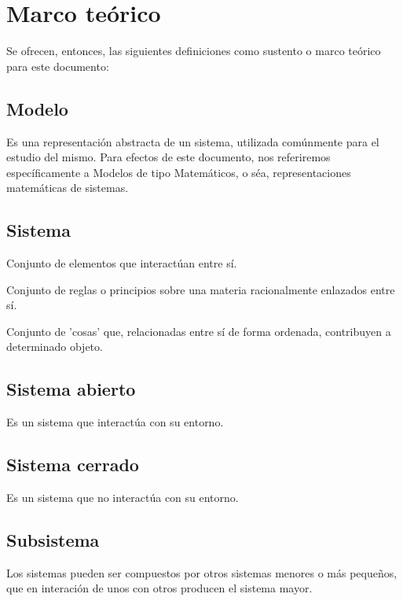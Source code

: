\section{Marco teórico}
Se ofrecen, entonces, las siguientes definiciones como sustento o marco teórico para este documento:


\subsection{Modelo}
Es una representación abstracta de un sistema, utilizada comúnmente para el estudio del mismo. Para efectos de este documento, nos referiremos específicamente a Modelos de tipo Matemáticos, o séa, representaciones matemáticas de sistemas.


\subsection{Sistema}
Conjunto de elementos que interactúan entre sí.

Conjunto de reglas o principios sobre una materia racionalmente enlazados entre sí.

Conjunto de 'cosas' que, relacionadas entre sí de forma ordenada, contribuyen a determinado objeto.


\subsection{Sistema abierto}
Es un sistema que interactúa con su entorno.


\subsection{Sistema cerrado}
Es un sistema que no interactúa con su entorno.


\subsection{Subsistema}
Los sistemas pueden ser compuestos por otros sistemas menores o más pequeños, que en interación de unos con otros producen el sistema mayor.

